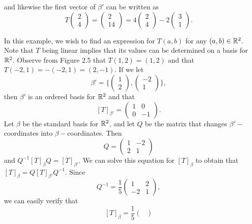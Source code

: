 \begin{eg}
and likewise the first vector of \( \beta'  \) can be written as
\[ T \begin{pmatrix}
    2 \\
    4
\end{pmatrix} = \begin{pmatrix}
    2 \\
    14
\end{pmatrix} = 4 \begin{pmatrix}
    2 \\
    4
\end{pmatrix} - 2 \begin{pmatrix}
    3 \\
    1
\end{pmatrix}.  \]
\end{eg}

\begin{eg}
In this example, we wish to find an expression for \( T(a,b)  \) for any \( (a,b) \in \mathbb{R}^{2} \). Note that \( T  \) being linear implies that its values can be determined on a basis for \( \mathbb{R}^{2} \). Observe from Figure 2.5 that \( T(1,2) = (1,2)  \) and that \( T(-2,1) = - (-2,1) = (2,-1) \). If we let 
\[  \beta' = \Big\{ \begin{pmatrix}
    1 \\
    2 
\end{pmatrix} , \begin{pmatrix}
    -2 \\
    1 
\end{pmatrix} \Big\},  \]
then \( \beta'  \) is an ordered basis for \( \mathbb{R}^{2}  \) and that 
\[ [T]_{\beta'} = \begin{pmatrix}
    1 & 0 \\
    0 & -1 
\end{pmatrix}.  \]
Let \( \beta  \) be the standard basis for \( \mathbb{R}^{2}  \), and let \( Q  \) be the matrix that changes \( \beta'- \)coordinates into \( \beta- \)coordinates. Then
\[  Q = \begin{pmatrix}
    1 & -2 \\
    2 & 1 
\end{pmatrix} \] and \( Q^{-1} [T]_{\beta} Q = [T]_{\beta'} \). We can solve this equation for \( [T]_{\beta}  \) to obtain that \( [T]_{\beta} = Q [T]_{\beta'} Q^{-1} \). Since 
\[  Q^{-1} = \frac{ 1 }{ 5 }  \begin{pmatrix}
    1 & 2 \\
    -2 & 1 
\end{pmatrix}, \]
we can easily verify that 
\[  [T]_{\beta} = \frac{ 1 }{ 5 } \begin{pmatrix}

\end{pmatrix}\]
\end{eg}
